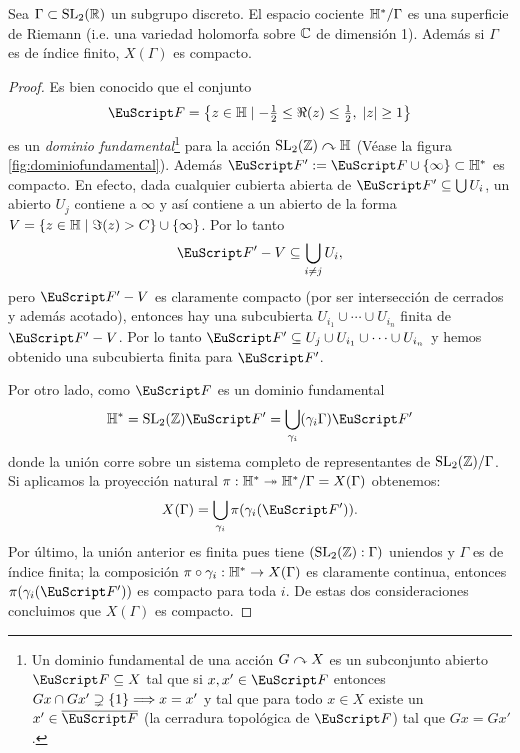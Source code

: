 \documentclass[../../tesis_maestria]{subfiles}
\begin{document}
\begin{thm}\label{thm:curvamodularcompacta}
  Sea $\Gamma\subset\mathrm{SL}_2(\mathbb{R})$ un subgrupo discreto. El espacio cociente $\mathbb{H}^*/\Gamma$ es una
  superficie de Riemann (i.e. una variedad holomorfa sobre $\mathbb{C}$ de dimensi\'on 1). Adem\'as si
  $\Gamma$ es de \'indice finito, $X(\Gamma)$ es compacto.
\end{thm}

\begin{proof}%
  Es bien conocido que el conjunto
  \[
    \Ff=
    \left\{z\in\HH\mid -\tfrac{1}{2}\leq\Re(z)\leq\tfrac{1}{2},\;\abs{z}\geq1\right\}
  \]
  es un \emph{dominio fundamental}\footnote{Un dominio fundamental de una acci\'on $G\curvearrowright X$ es un
    subconjunto abierto $\Ff\subseteq X$ tal que si $x,x'\in\Ff$ entonces $Gx\cap Gx'\supsetneq\{1\}\Longrightarrow x=x'$
    y tal que para todo $x\in X$ existe un $x'\in\ol{\Ff}$ (la cerradura topol\'ogica de $\Ff$) tal
    que $Gx=Gx'$.}
  para la acci\'on $\mathrm{SL}_2(\mathbb{Z})\curvearrowright\mathbb{H}$ (V\'ease la figura \ref{fig:dominiofundamental}). Adem\'as
  $\Ff':=\Ff\cup\{\infty\}\subset\HH^*$ es compacto. En efecto, dada cualquier cubierta abierta
  de $\Ff'\subseteq\bigcup U_i$, un abierto $U_j$ contiene a $\infty$ y as\'i contiene a un
  abierto de la forma $V=\{z\in\mathbb{H}\mid \Im(z)>C\}\cup\{\infty\}$. Por lo tanto
  \[
    \Ff'-V\subseteq\bigcup_{i\neq j} U_i,
  \]
  pero $\Ff'-V$ es claramente compacto (por ser intersecci\'on de cerrados y adem\'as acotado),
  entonces hay una subcubierta $U_{i_1}\cup\cdots\cup U_{i_n}$ finita de $\Ff'-V$. Por lo tanto
  $\Ff'\subseteq U_j\cup U_{i_1}\cup\cdots\cup U_{i_n}$ y hemos obtenido una subcubierta finita para
  $\Ff'$.

  Por otro lado, como $\Ff$ es un dominio fundamental
  \[
    \HH^*=\SL_2(\ZZ)\Ff'=\bigcup_{\gamma_i}(\gamma_i\Gamma) \Ff'
  \]
  donde la uni\'on corre sobre un sistema completo de representantes de $\mathrm{SL}_2(\mathbb{Z})/\Gamma$. Si
  aplicamos la proyecci\'on natural $\pi:\mathbb{H}^*\twoheadrightarrow \mathbb{H}^*/\Gamma=X(\Gamma)$ obtenemos:
  \[
    X(\Gamma)=\bigcup_{\gamma_i}\pi(\gamma_i(\Ff')).
  \]
  Por \'ultimo, la uni\'on anterior es finita pues tiene $(\mathrm{SL}_2(\mathbb{Z}):\Gamma)$ uniendos y $\Gamma$
  es de \'indice finita; la composici\'on $\pi\circ\gamma_i:\mathbb{H}^*\rightarrow X(\Gamma)$ es claramente
  continua, entonces $\pi(\gamma_i(\Ff'))$ es compacto para toda $i$. De estas dos consideraciones
  concluimos que $X(\Gamma)$ es compacto.
\end{proof}
\end{document}
